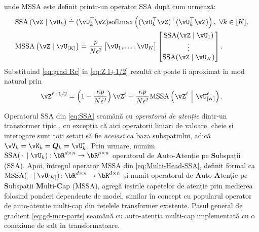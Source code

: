 \documentclass[../../book-main_ro.tex]{subfiles}
\begin{document}
unde MSSA este definit printr-un operator SSA după cum urmează:
\begin{align}
    & \mathrm{SSA}\left(\vZ \mid \vU_{k}\right) 
    \doteq (\vU_{k}^\top \vZ)\mathrm{softmax}\left((\vU_{k}^\top\vZ)^\top(\vU_{k}^\top\vZ)\right), \ \forall k \in [K], \label{eq:SSA} \\
    & \mathrm{MSSA}\left(\vZ \mid \vU_{[K]}\right) 
    \doteq \frac{p}{N\epsilon^2} \mat{\vU_{1}, \dots, \vU_{K}}\mat{\mathrm{SSA}({\vZ \mid \vU_{1}}) \\ \vdots \\ \mathrm{SSA}({\vZ \mid \vU_{K}})}.\label{eq:Multi-Head-SSA}
\end{align}
Substituind \eqref{eq:grad Rc} în \eqref{eq:Z l+1/2} rezultă că poate fi aproximat în mod natural prin
\begin{equation}
    \vZ^{\ell + 1/2} = \left(1 - \frac{\kappa p}{N\epsilon^2}\right) \vZ^{\ell} + \frac{\kappa p}{N\epsilon^2} \mathrm{MSSA}\left(\vZ^{\ell}\ \middle|\ \vU_{[K]}^{\ell}\right).  \label{eq:gd-mcr-parts} 
\end{equation}



\begin{remark}
    Operatorul SSA din \eqref{eq:SSA} seamănă cu \textit{operatorul de atenție} dintr-un transformer tipic \citep{vaswani2017attention}, cu excepția că aici operatorii liniari de valoare, cheie și interogare sunt toți setați să fie \textit{aceiași} ca baza subspațiului, adică $\vV_{k} = \vK_{k} = \bm{Q}_{k} = \vU_k^*$. Prin urmare, numim $\mathrm{SSA}({\spcdot\mid\vU_k}): \bR^{d\times n} \rightarrow \bR^{p\times n}$ operatorul de \textbf{A}uto-\textbf{A}tenție pe \textbf{S}ubspații (SSA). Apoi, întregul operator MSSA din \eqref{eq:Multi-Head-SSA}, definit formal ca \(\mathrm{MSSA}({\spcdot \mid \vU_{[K]}}) \colon \bR^{d \times n} \to \bR^{d \times n}\) și numit operatorul de \textbf{A}uto-\textbf{A}tenție pe \textbf{S}ubspații \textbf{M}ulti-\textbf{C}ap (MSSA), agregă ieșirile capetelor de atenție prin medierea folosind ponderi dependente de model, similar în concept cu popularul operator de auto-atenție multi-cap din rețelele transformer existente. Pasul general de gradient \eqref{eq:gd-mcr-parts} seamănă cu auto-atenția multi-cap implementată cu o conexiune de salt în transformatoare.
\end{remark}
\end{document}
